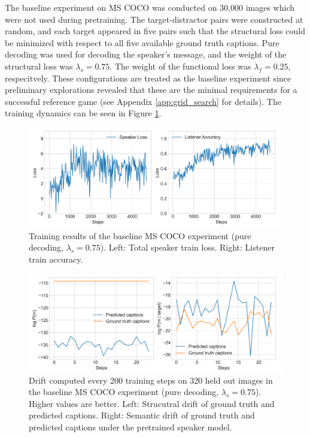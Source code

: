 The baseline experiment on MS COCO was conducted on 30,000 images which were not used during pretraining. The target-distractor pairs were constructed at random, and each target appeared in five pairs such that the structural loss could be minimized with respect to all five available ground truth captions. Pure decoding was used for decoding the speaker's message, and the weight of the structural loss was $\lambda_s = 0.75$. The weight of the functional loss was $\lambda_f = 0.25$, respecitvely. These configurations are treated as the baseline experiment since preliminary explorations revealed that these are the minimal requirements for a successful reference game (see Appendix \ref{app:grid_search} for details). The training dynamics can be seen in Figure \ref{fig:coco_baseline_075_speaker_loss_listener_acc}.

\begin{figure}
	\centering
	\includegraphics[width=\linewidth]{images/coco_refgame_4000_pure_075_random.png}
	\caption{Training results of the baseline MS COCO experiment (pure decoding, $\lambda_s = 0.75$). Left: Total speaker train loss. Right: Listener train accuracy.}
	\label{fig:coco_baseline_075_speaker_loss_listener_acc}
\end{figure}


\begin{figure}
	\centering
	\includegraphics[width=\linewidth]{images/coco_structural_semantic_drift_4000_pure_075_random.png}
	\caption{Drift computed every 200 training steps on 320 held out images in the baseline MS COCO experiment (pure decoding, $\lambda_s = 0.75$). Higher values are better. Left: Strucutral drift of ground truth and predicted captions. Right: Semantic drift of ground truth and predicted captions under the pretrained speaker model.\protect\footnotemark}
	\label{fig:coco_baseline_075_str_drift}
\end{figure}

